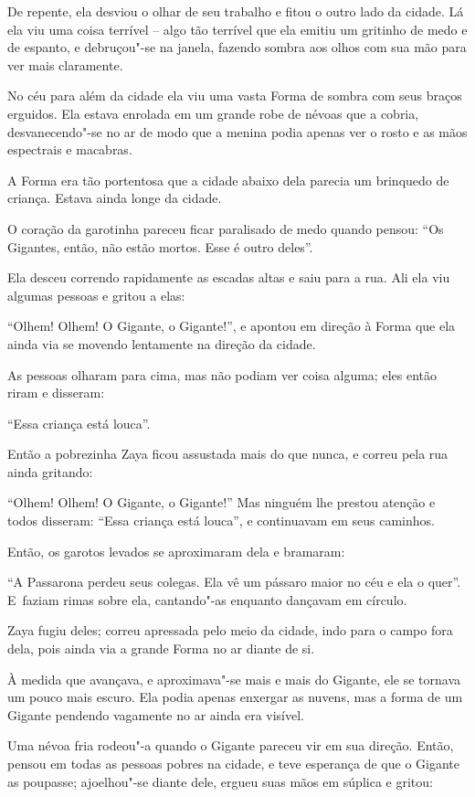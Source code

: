 De repente, ela desviou o olhar de seu trabalho e fitou o outro lado da
cidade. Lá ela viu uma coisa terrível -- algo tão terrível que ela
emitiu um gritinho de medo e de espanto, e debruçou"-se na janela,
fazendo sombra aos olhos com sua mão para ver mais claramente.

No céu para além da cidade ela viu uma vasta Forma de sombra com seus
braços erguidos. Ela estava enrolada em um grande robe de névoas que a
cobria, desvanecendo"-se no ar de modo que a menina podia apenas ver o
rosto e as mãos espectrais e macabras.

A Forma era tão portentosa que a cidade abaixo dela parecia um brinquedo
de criança. Estava ainda longe da cidade.

O coração da garotinha pareceu ficar paralisado de medo quando pensou:
``Os Gigantes, então, não estão mortos. Esse é outro deles''.

Ela desceu correndo rapidamente as escadas altas e saiu para a rua. Ali
ela viu algumas pessoas e gritou a elas:

``Olhem! Olhem! O Gigante, o Gigante!'', e apontou em direção à Forma
que ela ainda via se movendo lentamente na direção da cidade.

As pessoas olharam para cima, mas não podiam ver coisa alguma; eles
então riram e disseram:

``Essa criança está louca''.

Então a pobrezinha Zaya ficou assustada mais do que nunca, e correu pela
rua ainda gritando:

``Olhem! Olhem! O Gigante, o Gigante!'' Mas ninguém lhe prestou atenção
e todos disseram: ``Essa criança está louca'', e continuavam em seus
caminhos.

Então, os garotos levados se aproximaram dela e bramaram:

``A Passarona perdeu seus colegas. Ela vê um pássaro maior no céu e ela
o quer''. E~faziam rimas sobre ela, cantando"-as enquanto dançavam em
círculo.

Zaya fugiu deles; correu apressada pelo meio da cidade, indo para o
campo fora dela, pois ainda via a grande Forma no ar diante de si.

À medida que avançava, e aproximava"-se mais e mais do Gigante, ele se
tornava um pouco mais escuro. Ela podia apenas enxergar as nuvens, mas a
forma de um Gigante pendendo vagamente no ar ainda era visível.

Uma névoa fria rodeou"-a quando o Gigante pareceu vir em sua direção.
Então, pensou em todas as pessoas pobres na cidade, e teve esperança de
que o Gigante as poupasse; ajoelhou"-se diante dele, ergueu suas mãos em
súplica e gritou:

